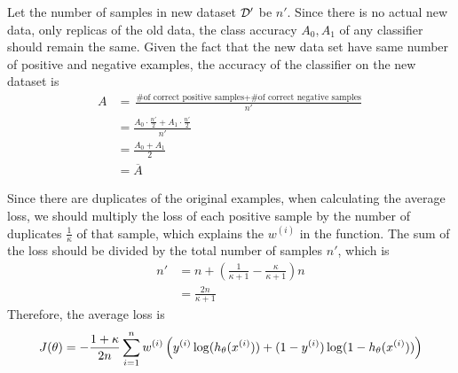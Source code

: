 \begin{answer}
    Let the number of samples in new dataset $\cal D'$ be $n'$. Since there is no
    actual new data, only replicas of the old data, the class accuracy $A_0, A_1$ of any 
    classifier should remain the same. Given the fact that the new data set have 
    same number of positive and negative examples, the accuracy of the classifier on the new
    dataset is
    \begin{align*}
        A &= \frac{\text{\# of correct positive samples} + \text{\# of correct negative samples}}{n'} \\
        &= \frac{A_0 \cdot \frac{n'}{2} + A_1 \cdot \frac{n'}{2}}{n'} \\
        &= \frac{A_0 + A_1}{2} \\
        &= \overline{A}
    \end{align*}

    Since there are duplicates of the original examples, when calculating the average
    loss, we should multiply the loss of each positive sample by the number of duplicates
    $\frac{1}{\kappa}$ of that sample, which explains the $w^{(i)}$ in the function. The
    sum of the loss should be divided by the total number of samples $n'$, which is
    \begin{align*}
        n' &= n + (\frac{1}{\kappa + 1} - \frac{\kappa}{\kappa + 1}) n \\
        &= \frac{2n}{\kappa + 1}
    \end{align*}
    Therefore, the average loss is
    $$
    J(\theta) = -\frac{1+\kappa}{2n} \sum_{i=1}^{n} w^{(i)} \left(y^{(i)}\log(h_{\theta}(x^{(i)})) + (1 - y^{(i)})\log(1 - h_{\theta}(x^{(i)}))\right)
    $$
\end{answer}